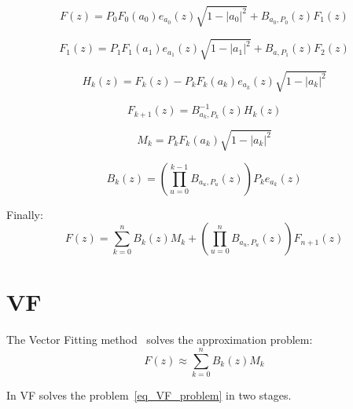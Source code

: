 \documentclass[journal]{IEEEtran}%
\begin{document}
\begin{equation}
  F(z) = P_0F_0(a_0)e_{a_0}(z)\sqrt{1 - |a_0|^2} + B_{a_0,P_0}(z)F_1(z)
\end{equation}

\begin{equation}
  F_1(z) = P_1F_1(a_1)e_{a_1}(z)\sqrt{1 - |a_1|^2} + B_{a,P_1}(z)F_2(z)
\end{equation}

\begin{equation}
  H_k(z) = F_k(z) - P_kF_k(a_k)e_{a_k}(z)\sqrt{1 - |a_k|^2}
\end{equation}

\begin{equation}
  F_{k+1}(z) = B^{-1}_{a_k,P_k}(z)H_k(z)
\end{equation}

\begin{equation}
  M_k = P_kF_k(a_k)\sqrt{1-|a_k|^2}
\end{equation}

\begin{equation}
  B_k(z) = \left(\prod_{u=0}^{k-1}{B_{a_u,P_u}(z)}\right)P_ke_{a_k}(z)
\end{equation}

Finally:
\begin{equation}\label{eq_Bk_decomposition}
  F(z) = \sum_{k=0}^n{B_k(z)M_k} + \left(\prod_{u=0}^{n}{B_{a_u,P_u}(z)}\right)F_{n+1}(z)
\end{equation}

\section{VF}

The Vector Fitting method~\cite{gustavsen1999rational,gustavsen2006improving} solves the approximation problem:
\begin{equation}\label{eq_VF_problem}
  F(z) \approx \sum_{k=0}^n{B_k(z)M_k} 
\end{equation}

In VF solves the problem~\eqref{eq_VF_problem} in two stages.
\end{document}
